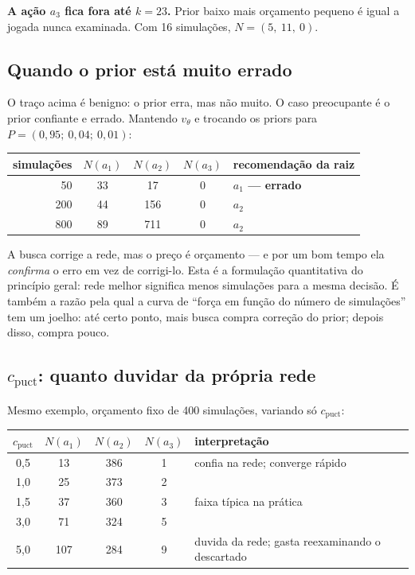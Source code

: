 \documentclass[11pt]{article}
\newcommand{\cpuct}{c_{\mathrm{puct}}}
\newcommand{\Nvis}{N}
\newcommand{\redeval}{v_{\theta}}
\begin{document}
\textbf{A ação $a_3$ fica fora até $k=23$.} Prior baixo mais orçamento pequeno é
igual a jogada nunca examinada. Com 16 simulações, $\Nvis = (5,\ 11,\ 0)$.

\subsection{Quando o prior está muito errado}

O traço acima é benigno: o prior erra, mas não muito. O caso preocupante é o prior
confiante e errado. Mantendo $\redeval$ e trocando os priors para
$P = (0{,}95;\ 0{,}04;\ 0{,}01)$:

\begin{center}
\begin{tabular}{rccc l}
\toprule
simulações & $\Nvis(a_1)$ & $\Nvis(a_2)$ & $\Nvis(a_3)$ & recomendação da raiz \\
\midrule
 50 & 33 &  17 & 0 & \textbf{$a_1$ — errado} \\
200 & 44 & 156 & 0 & $a_2$ \\
800 & 89 & 711 & 0 & $a_2$ \\
\bottomrule
\end{tabular}
\end{center}

A busca corrige a rede, mas o preço é orçamento — e por um bom tempo ela
\emph{confirma} o erro em vez de corrigi-lo. Esta é a formulação quantitativa do
princípio geral: rede melhor significa menos simulações para a mesma decisão. É
também a razão pela qual a curva de ``força em função do número de simulações''
tem um joelho: até certo ponto, mais busca compra correção do prior; depois disso,
compra pouco.

\subsection{$\cpuct$: quanto duvidar da própria rede}

Mesmo exemplo, orçamento fixo de 400 simulações, variando só $\cpuct$:

\begin{center}
\begin{tabular}{ccccl}
\toprule
$\cpuct$ & $\Nvis(a_1)$ & $\Nvis(a_2)$ & $\Nvis(a_3)$ & interpretação \\
\midrule
0,5 &  13 & 386 & 1 & confia na rede; converge rápido \\
1,0 &  25 & 373 & 2 & \\
1,5 &  37 & 360 & 3 & faixa típica na prática \\
3,0 &  71 & 324 & 5 & \\
5,0 & 107 & 284 & 9 & duvida da rede; gasta reexaminando o descartado \\
\bottomrule
\end{tabular}
\end{center}
\end{document}
